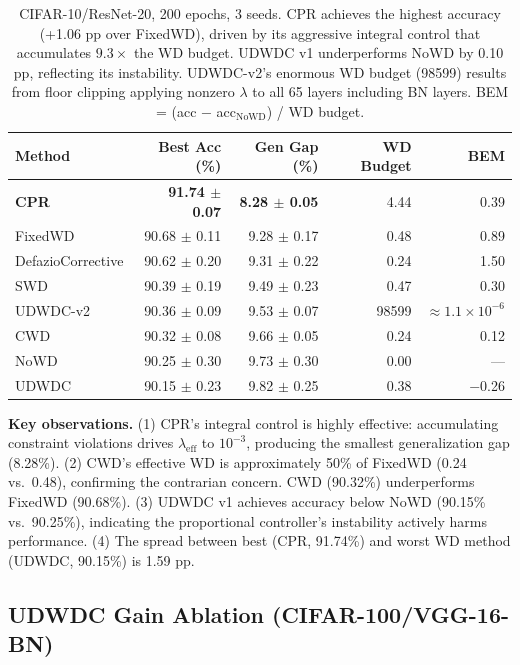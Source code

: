 \documentclass{article}
\begin{document}
\begin{table}[t]
\centering
\caption{CIFAR-10/ResNet-20, 200 epochs, 3 seeds. CPR achieves the highest accuracy (+1.06 pp over FixedWD), driven by its aggressive integral control that accumulates $9.3\times$ the WD budget. UDWDC v1 underperforms NoWD by 0.10 pp, reflecting its instability. UDWDC-v2's enormous WD budget (98599) results from floor clipping applying nonzero $\lambda$ to all 65 layers including BN layers. BEM = (acc $-$ acc$_{\text{NoWD}}$) / WD budget.}
\label{tab:cifar10}
\begin{tabular}{lrrrr}
\toprule
Method & Best Acc (\%) & Gen Gap (\%) & WD Budget & BEM \\
\midrule
\textbf{CPR} & \textbf{91.74 $\pm$ 0.07} & \textbf{8.28 $\pm$ 0.05} & 4.44 & 0.39 \\
FixedWD & 90.68 $\pm$ 0.11 & 9.28 $\pm$ 0.17 & 0.48 & 0.89 \\
DefazioCorrective & 90.62 $\pm$ 0.20 & 9.31 $\pm$ 0.22 & 0.24 & 1.50 \\
SWD & 90.39 $\pm$ 0.19 & 9.49 $\pm$ 0.23 & 0.47 & 0.30 \\
UDWDC-v2 & 90.36 $\pm$ 0.09 & 9.53 $\pm$ 0.07 & 98599 & ${\approx}1.1{\times}10^{-6}$ \\
CWD & 90.32 $\pm$ 0.08 & 9.66 $\pm$ 0.05 & 0.24 & 0.12 \\
NoWD & 90.25 $\pm$ 0.30 & 9.73 $\pm$ 0.30 & 0.00 & --- \\
UDWDC & 90.15 $\pm$ 0.23 & 9.82 $\pm$ 0.25 & 0.38 & $-$0.26 \\
\bottomrule
\end{tabular}
\end{table}

\textbf{Key observations.} (1) CPR's integral control is highly effective: accumulating constraint violations drives $\lambda_{\text{eff}}$ to $10^{-3}$, producing the smallest generalization gap (8.28\%). (2) CWD's effective WD is approximately 50\% of FixedWD (0.24 vs.~0.48), confirming the contrarian concern. CWD (90.32\%) underperforms FixedWD (90.68\%). (3) UDWDC v1 achieves accuracy below NoWD (90.15\% vs.~90.25\%), indicating the proportional controller's instability actively harms performance. (4) The spread between best (CPR, 91.74\%) and worst WD method (UDWDC, 90.15\%) is 1.59 pp.

\subsection{UDWDC Gain Ablation (CIFAR-100/VGG-16-BN)}
\end{document}
